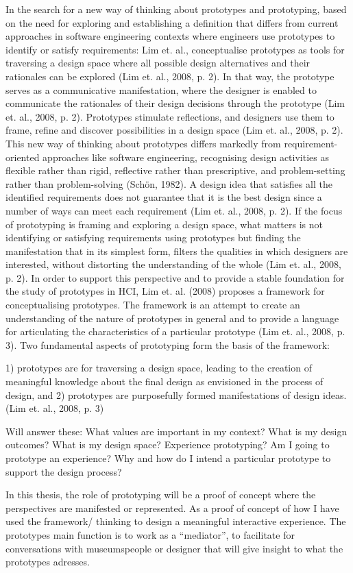 In the search for a new way of thinking about prototypes and prototyping, based on the need for exploring and establishing a definition that differs from current approaches in software engineering contexts where engineers use prototypes to identify or satisfy requirements: Lim et. al., conceptualise prototypes as tools for traversing a design space where all possible design alternatives and their rationales can be explored (Lim et. al., 2008, p. 2). In that way, the prototype serves as a communicative manifestation, where the designer is enabled to communicate the rationales of their design decisions through the prototype (Lim et. al., 2008, p. 2). Prototypes stimulate reflections, and designers use them to frame, refine and discover possibilities in a design space (Lim et. al., 2008, p. 2). This new way of thinking about prototypes differs markedly from requirement-oriented approaches like software engineering, recognising design activities as flexible rather than rigid, reflective rather than prescriptive, and problem-setting rather than problem-solving (Schön, 1982). A design idea that satisfies all the identified requirements does not guarantee that it is the best design since a number of ways can meet each requirement (Lim et. al., 2008, p. 2). If the focus of prototyping is framing and exploring a design space, what matters is not identifying or satisfying requirements using prototypes but finding the manifestation that in its simplest form, filters the qualities in which designers are interested, without distorting the understanding of the whole (Lim et. al., 2008, p. 2). In order to support this perspective and to provide a stable foundation for the study of prototypes in HCI, Lim et. al. (2008) proposes a framework for conceptualising prototypes. The framework is an attempt to create an understanding of the nature of prototypes in general and to provide a language for articulating the characteristics of a particular prototype (Lim et. al., 2008, p. 3). Two fundamental aspects of prototyping form the basis of the framework:

1) prototypes are for traversing a design space, leading to the creation of meaningful knowledge about the final design as envisioned in the process of design, and
2) prototypes are purposefully formed manifestations of design ideas.
(Lim et. al., 2008, p. 3)

Will answer these:
What values are important in my context?
What is my design outcomes?
What is my design space?
Experience prototyping? Am I going to prototype an experience?
Why and how do I intend a particular prototype to support the design process?

In this thesis, the role of prototyping will be a proof of concept where the perspectives are manifested or represented. As a proof of concept of how I have used the framework/ thinking to design a meaningful interactive experience.
The prototypes main function is to work as a “mediator”, to facilitate for conversations with museumspeople or designer that will give insight to what the prototypes adresses.
